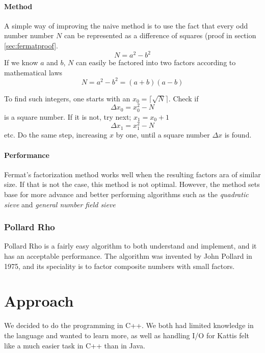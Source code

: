\documentclass[a4paper, 12pt]{report}
\begin{document}
\subsubsection{Method}
A simple way of improving the naive method is to use the fact that every odd number number $N$ can be represented as a difference of squares (proof in section \ref{sec:fermatproof}.
\begin{equation}
N = a^2 - b^2
\end{equation}
If we know $a$ and $b$, $N$ can easily be factored into two factors according to mathematical laws
\begin{equation}
N = a^2 - b^2 = (a + b)(a - b)
\end{equation}

To find such integers, one starts with an $x_0 = \lceil \sqrt{N} \rceil $. Check if 
\begin{equation}
\Delta x_0 = x_0^2 - N
\end{equation}
is a square number. If it is not, try next; $x_1 = x_0 + 1$
\begin{equation}
\Delta x_1 = x_1^2 - N
\end{equation}
etc. Do the same step, increasing $x$ by one, until a square number $ \Delta x $ is found.

\subsubsection{Performance}
Fermat's factorization method works well when the resulting factors ara of similar size. If that is not the case, this method is not optimal. However, the method sets base for more advance and better performing algorithms such as the \emph{quadratic sieve} and \emph{general number field sieve}

\subsection{Pollard Rho}
Pollard Rho is a fairly easy algorithm to both understand and implement, and it has an acceptable performance. The algorithm was invented by John Pollard in 1975, and its speciality is to factor composite numbers with small factors.


\chapter{Approach}
We decided to do the programming in C++. We both had limited knowledge in the language and wanted to learn more, as well as handling I/O for Kattis felt like a much easier task in C++ than in Java. 
\end{document}
